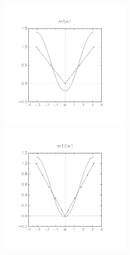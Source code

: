 \documentclass[11pt, a4paper, titlepage, openright]{article}
\begin{document}
    \begin{figure}[H]
        \begin{minipage}[b]{0.49\textwidth}
            \includegraphics[width=6.5cm, trim={2cm, 4cm, 2cm, 3cm}, clip]{../absImages/m5n1}
        \end{minipage}
        \hfill
        \begin{minipage}[b]{0.49\textwidth}
            \includegraphics[width=6.5cm, trim={2cm, 4cm, 2cm, 3cm}, clip]{../absImages/m10n1}
        \end{minipage}
    \end{figure}
\end{document}
